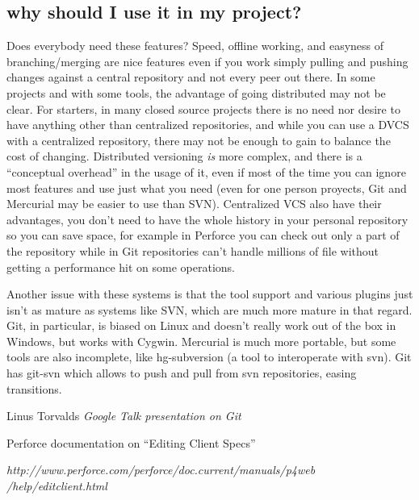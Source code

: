 \documentclass[%
	final,
	notitlepage,
	narroweqnarray,
	inline,
	twoside,
	]{ieee}
\newcommand{\latexiie}{\LaTeX2{\Large$_\varepsilon$}}
\begin{document}
\subsection{why should I use it in my project?}
Does everybody need these features? Speed, offline working, 
and easyness of branching/merging are nice features even if you work simply pulling 
and pushing changes against a central repository and not every peer out there. In some 
projects and with some tools, the advantage of going distributed may not be clear. 
For starters, in many closed source projects there is no need nor desire to have anything
other than centralized repositories, and while you can use a DVCS with a centralized
repository, there may not be enough to gain to balance the cost of changing. Distributed 
versioning \emph{is} more complex, and there is a ``conceptual overhead'' in the usage 
of it, even if most of the time you can ignore most features and use just what you need 
(even for one person proyects, Git and Mercurial may be easier to use than SVN).
Centralized VCS also have their advantages, you don't need to have the whole history in your 
personal repository so you can save space, for example in Perforce you can check out only a part of the 
repository\cite{perforceclientspec} while in Git repositories can't handle millions of file 
without getting a performance hit on some operations\cite{linusgit}.

Another issue with these systems is that the tool support and various plugins just isn't as 
mature as systems like SVN, which are much more mature in that regard. Git, in particular, is 
biased on Linux and doesn't really work out of the box in Windows, but works with Cygwin. 
Mercurial is much more portable, but some tools are also incomplete, like hg-subversion (a tool 
to interoperate with svn). Git has git-svn which allows to push and pull from svn repositories, 
easing transitions.




\begin{thebibliography}{1}

% 

Linus Torvalds
\newblock \emph{Google Talk presentation on Git}

Perforce documentation on ``Editing Client Specs''

\newblock \emph{
http://www.perforce.com/perforce/doc.current/manuals/p4web
/help/editclient.html
}

\end{thebibliography}

\end{document}

